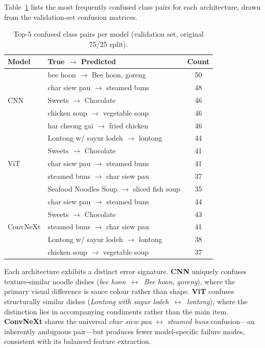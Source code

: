 Table~\ref{tab:confusion} lists the most frequently confused class
pairs for each architecture, drawn from the validation-set confusion
matrices.

\begin{table}[ht]
\centering
\caption{Top-5 confused class pairs per model (validation set,
         original 75/25 split).}
\label{tab:confusion}
\small
\begin{tabular}{llc}
\toprule
\textbf{Model} & \textbf{True $\to$ Predicted} & \textbf{Count} \\
\midrule
\multirow{5}{*}{CNN}
  & bee hoon $\to$ Bee hoon, goreng         & 50 \\
  & char siew pau $\to$ steamed buns        & 48 \\
  & Sweets $\to$ Chocolate                  & 46 \\
  & chicken soup $\to$ vegetable soup       & 46 \\
  & har cheong gai $\to$ fried chicken      & 46 \\
\midrule
\multirow{5}{*}{ViT}
  & Lontong w/ sayur lodeh $\to$ lontong    & 44 \\
  & Sweets $\to$ Chocolate                  & 41 \\
  & char siew pau $\to$ steamed buns        & 41 \\
  & steamed buns $\to$ char siew pau        & 37 \\
  & Seafood Noodles Soup $\to$ sliced fish soup & 35 \\
\midrule
\multirow{5}{*}{ConvNeXt}
  & char siew pau $\to$ steamed buns        & 44 \\
  & Sweets $\to$ Chocolate                  & 43 \\
  & steamed buns $\to$ char siew pau        & 41 \\
  & Lontong w/ sayur lodeh $\to$ lontong    & 38 \\
  & chicken soup $\to$ vegetable soup       & 37 \\
\bottomrule
\end{tabular}
\end{table}

Each architecture exhibits a distinct error signature.
\textbf{CNN} uniquely confuses texture-similar noodle dishes
(\emph{bee hoon}~$\leftrightarrow$~\emph{Bee hoon, goreng}), where the
primary visual difference is sauce colour rather than shape.
\textbf{ViT} confuses structurally similar dishes
(\emph{Lontong with sayur lodeh}~$\leftrightarrow$~\emph{lontong}),
where the distinction lies in accompanying condiments rather than the
main item.
\textbf{ConvNeXt} shares the universal \emph{char siew pau}
$\leftrightarrow$ \emph{steamed buns} confusion---an inherently
ambiguous pair---but produces fewer model-specific failure modes,
consistent with its balanced feature extraction.

